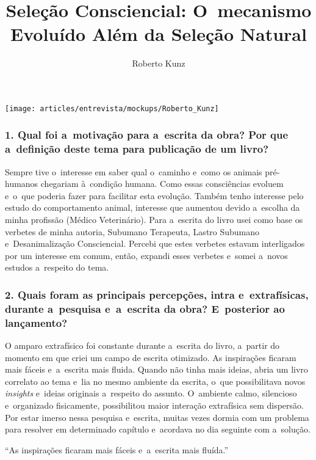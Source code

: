 \documentclass{gescons}
\author{Roberto Kunz}
\title{Seleção Consciencial: O~mecanismo Evoluído Além da Seleção Natural}
\begin{document}
    \makeentrevistatitle

    \begin{multicols}{2}

\begin{center}
    \texttt{[image: articles/entrevista/mockups/Roberto\_Kunz]}
\end{center}


\subsubsection{1. Qual foi a~motivação para a~escrita da obra? Por que a~definição deste tema para publicação de um livro?}

Sempre tive o~interesse em saber qual o~caminho e~como os animais pré-humanos chegariam à~condição humana. Como essas consciências evoluem e~o~que poderia fazer para facilitar esta evolução. Também tenho interesse pelo estudo do comportamento animal, interesse que aumentou devido a~escolha da minha profissão (Médico Veterinário). Para a~escrita do livro usei como base os verbetes de minha autoria, Subumano Terapeuta, Lastro Subumano e~Desanimalização Consciencial. Percebi que estes verbetes estavam interligados por um interesse em comum, então, expandi esses verbetes e~somei a~novos estudos a~respeito do tema.

\subsubsection{2. Quais foram as principais percepções, intra e~extrafísicas, durante a~pesquisa e~a~escrita da obra? E~posterior ao lançamento?}

O amparo extrafísico foi constante durante a~escrita do livro, a~partir do momento em que criei um campo de escrita otimizado. As inspirações ficaram mais fáceis e~a~escrita mais fluida. Quando não tinha mais ideias, abria um livro correlato ao tema e~lia no mesmo ambiente da escrita, o~que possibilitava novos \emph{insights} e~ideias originais a~respeito do assunto. O~ambiente calmo, silencioso e~organizado fisicamente, possibilitou maior interação extrafísica sem dispersão. Por estar imerso nessa pesquisa e~escrita, muitas vezes dormia com um problema para resolver em determinado capítulo e~acordava no dia seguinte com a~solução.

\begin{pullquote}
    ``As inspirações ficaram mais fáceis e~a~escrita mais fluída.''
\end{pullquote}


\end{multicols}
\end{document}

